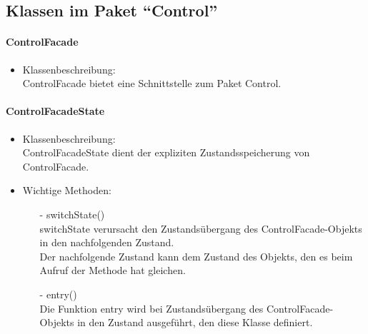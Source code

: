 \documentclass[parskip=full]{scrartcl}
\begin{document}
\subsection{Klassen im Paket \enquote{Control}}
    \paragraph{ControlFacade}
        \begin{itemize}
            \item Klassenbeschreibung:\\
                ControlFacade bietet eine Schnittstelle zum Paket Control.\\ 
        \end{itemize}

    \paragraph{ControlFacadeState}
        \begin{itemize}
            \item Klassenbeschreibung:\\
                ControlFacadeState dient der expliziten Zustandsspeicherung von ControlFacade.\\
            \item Wichtige Methoden:\\
                \begin{itemize}
                    \item[-] switchState()\\
                        switchState verursacht den Zustandsübergang des ControlFacade-Objekts in den
                        nachfolgenden Zustand.\\
                        Der nachfolgende Zustand kann dem Zustand des Objekts, den es beim Aufruf 
                        der Methode hat gleichen.\\

                    \item[-] entry()\\
                        Die Funktion entry wird bei Zustandsübergang des ControlFacade-Objekts in
                        den Zustand ausgeführt, den diese Klasse definiert.
                \end{itemize}
        \end{itemize}
\end{document}
